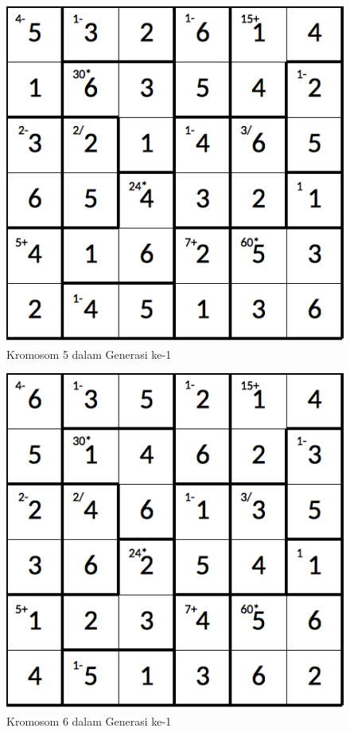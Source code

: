 \documentclass[a4paper,twoside]{article}
\begin{document}
\begin{enumerate}
\begin{figure}
\centering
\captionsetup{justification=centering}
\includegraphics[scale=0.333]{Gambar/hybridgenetic/Generation1Chromosome5}
\caption[Kromosom 5 dalam Generasi ke-1]{Kromosom 5 dalam Generasi ke-1}
\label{fig:analisisg1k5}
\end{figure}

\begin{figure}
\centering
\captionsetup{justification=centering}
\includegraphics[scale=0.333]{Gambar/hybridgenetic/Generation1Chromosome6}
\caption[Kromosom 6 dalam Generasi ke-1]{Kromosom 6 dalam Generasi ke-1}
\label{fig:analisisg1k6}
\end{figure}


\end{enumerate}
\end{document}
